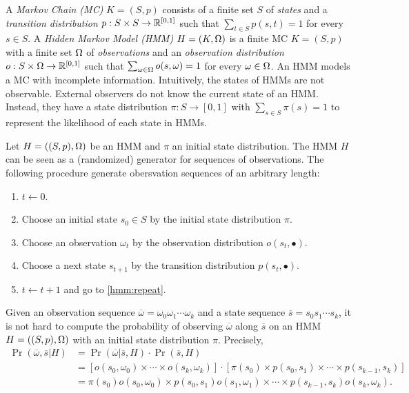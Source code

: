 
A \emph{Markov Chain (MC)} $K = (S, p)$ consists of a finite set $S$ of
\emph{states} and a \emph{transition distribution} $p : S \times S
\rightarrow \mathbb{R}^{[0, 1]}$ such that $\sum_{t \in S} p (s, t) = 1$ for every
$s \in S$.
A \emph{Hidden Markov Model (HMM)} $H = (K, \Omega)$ is a finite MC $K =
(S, p)$ with a finite set $\Omega$ of \emph{observations} and an
\emph{observation distribution} $o : S \times \Omega \rightarrow \mathbb{R}^{[0, 1]}$
such that $\sum_{\omega \in \Omega} o (s, \omega) = 1$ for every $\omega \in
\Omega$. An HMM models a MC with incomplete information. Intuitively,
the states of HMMs are not observable. External observers do not know
the current state of an HMM. Instead, they have a state distribution
$\pi : S \rightarrow [0, 1]$ with $\sum_{s \in S} \pi (s) = 1$
to represent the likelihood of each state in HMMs.

Let $H = ((S, p), \Omega)$ be an HMM and $\pi$ an initial state
distribution. The HMM $H$ can be seen as a (randomized) generator for
sequences of observations. The following procedure generate
obersvation sequences of an arbitrary length:
\begin{enumerate}
\item $t \leftarrow 0$.
\item Choose an initial state $s_0 \in S$ by the initial state
  distribution $\pi$.
\item \label{hmm:repeat}
  Choose an observation $\omega_t$ by the observation distribution
  $o (s_t, \bullet)$.
\item Choose a next state $s_{t+1}$ by the transition distribution
  $p (s_t, \bullet)$.
\item $t \leftarrow t + 1$ and go to \ref{hmm:repeat}.
\end{enumerate}

Given an observation sequence $\overline{\omega} =
\omega_0\omega_1\cdots\omega_k$ and a state sequence $\overline{s} =
s_0s_1\cdots s_k$, it is not hard to compute the probability of
observing $\overline{\omega}$ along $\overline{s}$ on an HMM $H = ((S,
p), \Omega)$ with an initial state distribution $\pi$. Precisely,
\begin{align*}
  \Pr (\overline{\omega}, \overline{s} | H)
  & = \Pr (\overline{\omega} | \overline{s}, H) \cdot \Pr (\overline{s}, H)\\
  & = [o (s_0, \omega_0) \times \cdots
    \times o (s_k, \omega_k)] \cdot
      [\pi (s_0) \times p (s_0, s_1) \times \cdots
    \times p (s_{k-1}, s_k)] \\
  & = \pi (s_0) o (s_0, \omega_0) \times
    p (s_0, s_1) o (s_1, \omega_1) \times \cdots \times
    p (s_{k-1}, s_k) o (s_k, \omega_k).
\end{align*}
